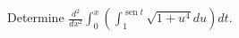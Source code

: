 \item Determine $\displaystyle \frac{d^2}{dx^2} \int_0^x \left( \int_1^{\operatorname{sen} t} \sqrt{1 + u^4} du \right) dt$.

